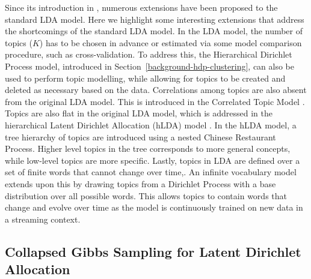 Since its introduction in \cite{Blei2003}, numerous extensions have been proposed to the standard LDA model. Here we highlight some interesting extensions that address the shortcomings of the standard LDA model. In the LDA model, the number of topics ($K$) has to be chosen in advance or estimated via some model comparison procedure, such as cross-validation. To address this, the Hierarchical Dirichlet Process model, introduced in Section~\ref{background-hdp-clustering}, can also be used to perform topic modelling, while allowing for topics to be created and deleted as necessary based on the data. Correlations among topics are also absent from the original LDA model. This is introduced in the Correlated Topic Model \cite{blei2006correlated}. Topics are also flat in the original LDA model, which is addressed in the hierarchical Latent Dirichlet Allocation (hLDA) model \cite{griffiths2004hierarchical}. In the hLDA model, a tree hierarchy of topics are introduced using a nested Chinese Restaurant Process. Higher level topics in the tree corresponds to more general concepts, while low-level topics are more specific. Lastly, topics in LDA are defined over a set of finite words that cannot change over time,. An infinite vocabulary model \cite{zhai2013online} extends upon this by drawing topics from a Dirichlet Process with a base distribution over all possible words. This allows topics to contain words that change and evolve over time as the model is continuously trained on new data in a streaming context.

\subsection{Collapsed Gibbs Sampling for Latent Dirichlet Allocation}

